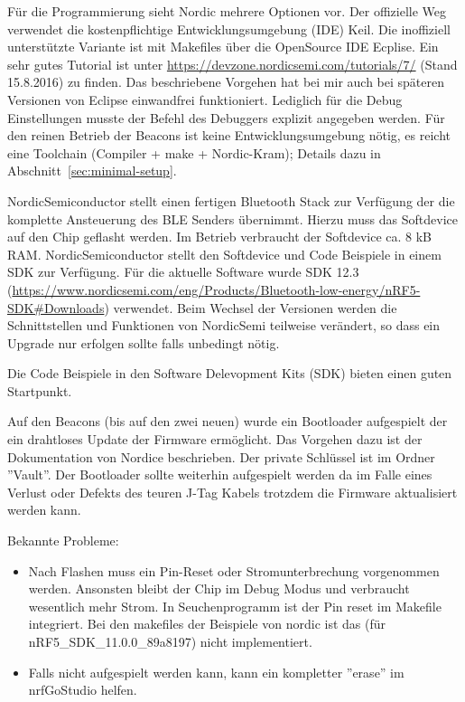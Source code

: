 \documentclass[11pt,ngerman]{scrartcl} %
\begin{document}
Für die Programmierung sieht Nordic mehrere Optionen vor. Der offizielle Weg verwendet die kostenpflichtige Entwicklungsumgebung (IDE) Keil. Die inoffiziell unterstützte Variante ist mit Makefiles über die OpenSource IDE Ecplise. Ein sehr gutes Tutorial ist unter \url{https://devzone.nordicsemi.com/tutorials/7/} (Stand 15.8.2016) zu finden. Das beschriebene Vorgehen hat bei mir auch bei späteren Versionen von Eclipse einwandfrei funktioniert. Lediglich für die Debug Einstellungen musste der Befehl des Debuggers explizit angegeben werden. Für den reinen Betrieb der Beacons ist keine Entwicklungsumgebung nötig, es reicht eine Toolchain (Compiler + make + Nordic-Kram); Details dazu in Abschnitt~\ref{sec:minimal-setup}.

NordicSemiconductor stellt einen fertigen Bluetooth Stack zur Verfügung der die komplette Ansteuerung des BLE Senders übernimmt. Hierzu muss das Softdevice auf den Chip geflasht werden. Im Betrieb verbraucht der Softdevice ca. 8 kB RAM.
NordicSemiconductor stellt den Softdevice und Code Beispiele in einem SDK zur Verfügung. Für die aktuelle Software wurde SDK 12.3 (\url{https://www.nordicsemi.com/eng/Products/Bluetooth-low-energy/nRF5-SDK\#Downloads}) verwendet. Beim Wechsel der Versionen werden die Schnittstellen und Funktionen von NordicSemi teilweise verändert, so dass ein Upgrade nur erfolgen sollte falls unbedingt nötig.

Die Code Beispiele in den Software Delevopment Kits (SDK) bieten einen guten Startpunkt. 

Auf den Beacons (bis auf den zwei neuen) wurde ein Bootloader aufgespielt der ein drahtloses Update der Firmware ermöglicht. Das Vorgehen dazu ist der Dokumentation von Nordice beschrieben. Der private Schlüssel ist im Ordner ''Vault''. Der Bootloader sollte weiterhin aufgespielt werden da im Falle eines Verlust oder Defekts des teuren J-Tag Kabels trotzdem die Firmware aktualisiert werden kann.


Bekannte Probleme:
\begin{itemize}
\item  Nach Flashen muss ein Pin-Reset oder Stromunterbrechung vorgenommen werden. Ansonsten bleibt der Chip im Debug Modus und verbraucht wesentlich mehr Strom.  In Seuchenprogramm ist der Pin reset im Makefile integriert. Bei den makefiles der Beispiele von nordic ist das (für nRF5\_SDK\_11.0.0\_89a8197) nicht implementiert.
\item Falls nicht aufgespielt werden kann, kann ein kompletter ''erase'' im nrfGoStudio helfen.
\end{itemize}
\end{document}
